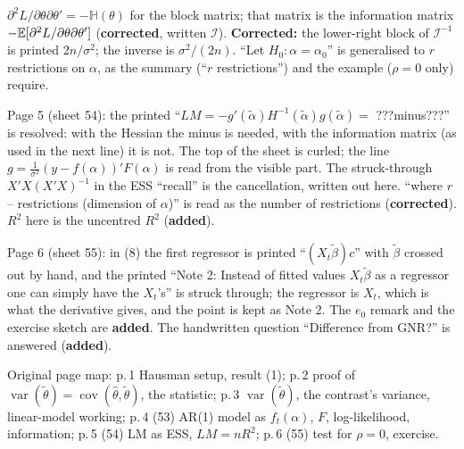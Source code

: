 \documentclass[11pt]{article}
\begin{document}
\begin{transcriptnotes}
       $\partial^{2}L/\partial\theta\partial\theta'=-\mathbb H(\theta)$ for the block matrix; that matrix is the
       information matrix $-\mathbb{E}[\partial^{2}L/\partial\theta\partial\theta']$ (\textbf{corrected}, written $\mathcal I$).
       \textbf{Corrected:} the lower-right block of $\mathcal I^{-1}$ is printed $2n/\sigma^{2}$; the inverse is $\sigma^{2}/(2n)$.
       ``Let $H_{0}\colon\alpha=\alpha_{0}$'' is generalised to $r$ restrictions on $\alpha$, as the summary (``$r$ restrictions'')
       and the example ($\rho=0$ only) require.
 \item Page 5 (sheet 54): the printed ``$LM=-g'(\tilde\alpha)H^{-1}(\tilde\alpha)g(\tilde\alpha)=$ ???minus???'' is resolved: with the
       Hessian the minus is needed, with the information matrix (as used in the next line) it is not.
       The top of the sheet is curled; the line $g=\frac1{\sigma^{2}}(y-f(\alpha))'F(\alpha)$ is read from the visible part.
       The struck-through $X'X(X'X)^{-1}$ in the ESS ``recall'' is the cancellation, written out here.
       ``where $r$ -- restrictions (dimension of $\alpha$)'' is read as the number of restrictions (\textbf{corrected}).
       $R^{2}$ here is the uncentred $R^{2}$ (\textbf{added}).
 \item Page 6 (sheet 55): in (8) the first regressor is printed ``$(X_{t}\tilde\beta)c$'' with $\tilde\beta$ crossed out by hand,
       and the printed ``Note 2: Instead of fitted values $X_{t}\tilde\beta$ as a regressor one can simply have the
       $X_{t}$'s'' is struck through; the regressor is $X_{t}$, which is what the derivative gives, and the point is
       kept as Note 2. The $e_{0}$ remark and the exercise sketch are \textbf{added}. The handwritten question
       ``Difference from GNR?'' is answered (\textbf{added}).
 \item Original page map: p.\,1 Hausman setup, result (1); p.\,2 proof of $\operatorname{var}(\tilde\theta)=\operatorname{cov}(\hat\theta,\tilde\theta)$, the
       statistic; p.\,3 $\operatorname{var}(\tilde\theta)$, the contrast's variance, linear-model working; p.\,4 (53) AR(1) model as
       $f_{t}(\alpha)$, $F$, log-likelihood, information; p.\,5 (54) LM as ESS, $LM=nR^{2}$; p.\,6 (55) test for $\rho=0$,
       exercise.
\end{transcriptnotes}
\end{document}
